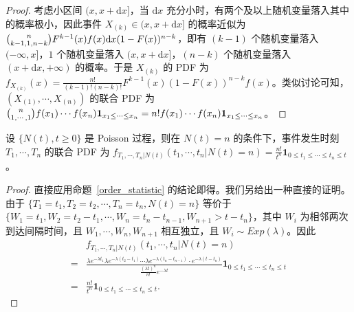 \documentclass[../main.tex]{subfiles}
\begin{document}
\begin{proof}
    考虑小区间 $(x,x+\mathrm dx]$，当 $\mathrm dx$ 充分小时，有两个及以上随机变量落入其中的概率极小，因此事件 $X_{(k)}\in(x,x+\mathrm dx]$ 的概率近似为 $\tbinom{n}{k-1,1,n-k}F^{k-1}(x)f(x)\mathrm dx(1-F(x))^{n-k}$，即有 $(k-1)$ 个随机变量落入 $(-\infty,x]$，$1$ 个随机变量落入 $(x,x+\mathrm dx]$，$(n-k)$ 个随机变量落入 $(x+\mathrm dx,+\infty)$ 的概率。于是 $X_{(k)}$ 的 PDF 为 $f_{X_{(k)}}(x)=\frac{n!}{(k-1)!(n-k)!}F^{k-1}(x)(1-F(x))^{n-k}f(x)$。类似讨论可知，$(X_{(1)},\cdots,X_{(n)})$ 的联合 PDF 为 $\tbinom{n}{1,\cdots,1}f(x_1)\cdots f(x_n)\mathbf 1_{x_1\leq\cdots\leq x_n}=n!f(x_1)\cdots f(x_n)\mathbf 1_{x_1\leq\cdots\leq x_n}$。
\end{proof}

\begin{theorem}\label{thm:6.4.5}
    设 $\{N(t),t\geq0\}$ 是 Poisson 过程，则在 $N(t)=n$ 的条件下，事件发生时刻 $T_1,\cdots,T_n$ 的联合 PDF 为 $f_{T_1,\cdots,T_n|N(t)}(t_1,\cdots,t_n|N(t)=n)=\frac{n!}{t^n}\mathbf 1_{0\leq t_1\leq\cdots\leq t_n\leq t}$。
\end{theorem}

\begin{proof}
    直接应用命题~\ref{order_statistic} 的结论即得。我们另给出一种直接的证明。\\
    由于 $\{T_1=t_1,T_2=t_2,\cdots,T_n=t_n,N(t)=n\}$ 等价于 $\{W_1=t_1,W_2=t_2-t_1,\cdots,W_n=t_n-t_{n-1},W_{n+1}>t-t_n\}$，其中 $W_i$ 为相邻两次到达间隔时间，且 $W_1,\cdots,W_n,W_{n+1}$ 相互独立，且 $W_i\sim Exp(\lambda)$。因此
    \begin{equation*}
        \begin{aligned}
              & f_{T_1,\cdots,T_n|N(t)}(t_1,\cdots,t_n|N(t)=n)                                                                                                                                                                    \\
            = & \frac{\lambda e^{-\lambda t_1}\lambda e^{-\lambda(t_2-t_1)}\cdots\lambda e^{-\lambda(t_n-t_{n-1})}\cdot e^{-\lambda(t-t_n)}}{\frac{(\lambda t)^n}{n!}e^{-\lambda t}}\mathbf 1_{0\leq t_1\leq\cdots\leq t_n\leq t} \\
            = & \frac{n!}{t^n}\mathbf 1_{0\leq t_1\leq\cdots\leq t_n\leq t}.
        \end{aligned}
    \end{equation*}
\end{proof}
\end{document}
